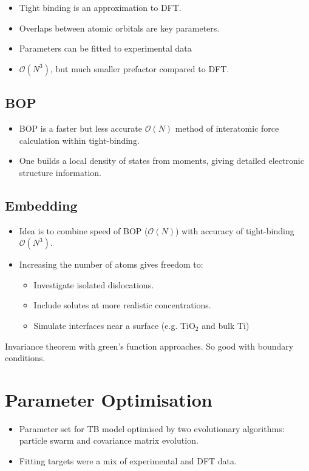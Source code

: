 \documentclass[11pt]{article}
\begin{document}
\begin{itemize}
\item Tight binding is an approximation to DFT.
\item Overlaps between atomic orbitals are key parameters.
\item Parameters can be fitted to experimental data
\item \(\mathcal{O}(N^3)\), but much smaller prefactor compared to DFT.
\end{itemize}

\subsection*{BOP}
\label{sec:orgd919a42}

\begin{itemize}
\item BOP is a faster but less accurate \(\mathcal{O}(N)\) method of interatomic
force calculation within tight-binding.
\item One builds a local density of states from moments, giving detailed
electronic structure information.
\end{itemize}


\subsection*{Embedding}
\label{sec:org76df04e}

\begin{itemize}
\item Idea is to combine speed of BOP (\(\mathcal{O}(N)\)) with accuracy of
tight-binding \(\mathcal{O}(N^3)\).
\item Increasing the number of atoms gives freedom to:
\begin{itemize}
\item Investigate isolated dislocations.
\item Include solutes at more realistic concentrations.
\item Simulate interfaces near a surface (e.g. TiO\(_2\) and
bulk Ti)
\end{itemize}
\end{itemize}
\begin{NOTES}
Invariance theorem with green's function approaches. So good with boundary
conditions. 
\end{NOTES}


\section*{Parameter Optimisation}
\label{sec:org3d958e7}
\begin{itemize}
\item Parameter set for TB model optimised by two evolutionary algorithms:
particle swarm and covariance matrix evolution.
\item Fitting targets were a mix of experimental and DFT data.
\end{itemize}
\end{document}
